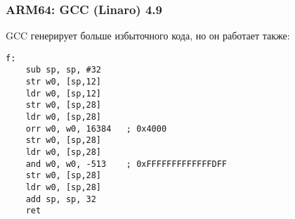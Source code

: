 \subsubsection{ARM64: \NonOptimizing GCC (Linaro) 4.9}

\NonOptimizing GCC генерирует больше избыточного кода, но он работает также:

\begin{lstlisting}[caption=\NonOptimizing GCC (Linaro) 4.9]
f:
	sub	sp, sp, #32
	str	w0, [sp,12]
	ldr	w0, [sp,12]
	str	w0, [sp,28]
	ldr	w0, [sp,28]
	orr	w0, w0, 16384	; 0x4000
	str	w0, [sp,28]
	ldr	w0, [sp,28]
	and	w0, w0, -513	; 0xFFFFFFFFFFFFFDFF
	str	w0, [sp,28]
	ldr	w0, [sp,28]
	add	sp, sp, 32
	ret
\end{lstlisting}

